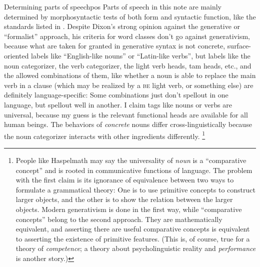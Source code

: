 \documentclass[UTF8, a4paper, oneside, scheme=plain]{ctexrep}
\newcommand*{\citesec}[1]{\S~{#1}}
\newcommand*{\term}[1]{\emph{#1}}
\newcommand{\category}[1]{\textsc{#1}}
\begin{document}
\begin{theorybox}{Determining parts of speech}{pos}
    Parts of speech in this note are mainly determined 
    by morphosyntactic tests of both form and syntactic function,
    like the standards listed in \citet[\citesec{3.3}]{dixon2009basic1}.
    Despite Dixon's strong opinion against the generative or ``formalist'' approach,
    his criteria for word classes don't go against generativism,
    because what are taken for granted in generative syntax 
    is not concrete, surface-oriented labels like ``English-like nouns'' or ``Latin-like verbs'', 
    but labels like the noun categorizer, the verb categorizer,
    the light verb heads, \acs{tam} heads, etc.,
    and the allowed combinations of them, 
    like whether a noun is able to replace the main verb in a clause 
    (which may be realized by a \category{be} light verb, or something else)
    are definitely language-specific:
    Some combinations just don't spellout in one language,
    but spellout well in another.
    I claim tags like nouns or verbs are universal,
    because my guess is the relevant functional heads are available for all human beings.
    The behaviors of \emph{concrete} nouns differ cross-linguistically
    because the noun categorizer interacts with other ingredients differently.%
    \footnote{
        People like Haspelmath may say the universality of \term{noun} 
        is a ``comparative concept'' and is rooted in communicative functions of language.
        The problem with the first claim is its ignorance of equivalence between 
        two ways to formulate a grammatical theory:
        One is to use primitive concepts to construct larger objects,
        and the other is to show the relation between the larger objects.
        Modern generativism is done in the first way,
        while ``comparative concepts'' belong to the second approach.
        They are mathematically equivalent,
        and asserting there are useful comparative concepts 
        is equivalent to asserting the existence of primitive features.
        (This is, of course, true for a theory of \emph{competence};
        a theory about psycholinguistic reality and \emph{performance} is another story.)

}
\end{theorybox}
\end{document}
